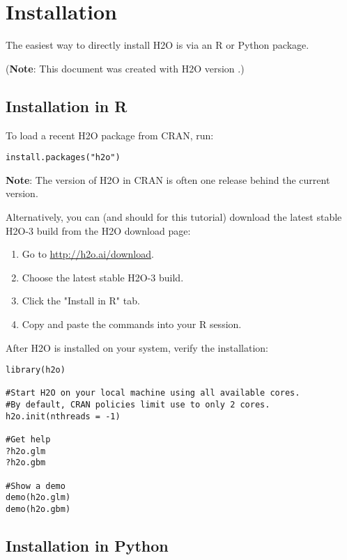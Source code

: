 \section{Installation} 

The easiest way to directly install H2O is  via an R or Python package.

({\bf{Note}}: This document was created with H2O version \waterVersion.)

\subsection{Installation in R}

To load a recent H2O package from CRAN, run:

\begin{lstlisting}[style=R]
install.packages("h2o")
\end{lstlisting}

{\bf{Note}}: The version of H2O in CRAN is often one release behind the current version.

Alternatively, you can (and should for this tutorial) download the
latest stable H2O-3 build from the H2O download page:

\begin{enumerate}
\item Go to {\url{http://h2o.ai/download}}.
\item Choose the latest stable H2O-3 build.
\item Click the "Install in R" tab.
\item Copy and paste the commands into your R session.
\end{enumerate}

\bigskip
After H2O is installed on your system, verify the installation:

\begin{lstlisting}[style=R]
library(h2o)

#Start H2O on your local machine using all available cores.
#By default, CRAN policies limit use to only 2 cores.
h2o.init(nthreads = -1)

#Get help
?h2o.glm
?h2o.gbm

#Show a demo
demo(h2o.glm)
demo(h2o.gbm)
\end{lstlisting}

\subsection{Installation in Python}

